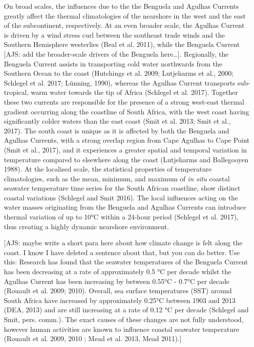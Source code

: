 \documentclass[12pt,A4paper,]{article}
\begin{document}
On broad scales, the influences due to the the Benguela and Agulhas
Currents greatly affect the thermal climatologies of the nearshore in
the west and the east of the subcontinent, respectively. At an even
broader scale, the Agulhas Current is driven by a wind stress curl
between the southeast trade winds and the Southern Hemisphere westerlies
(Beal et al. 2011), while the Benguela Current {[}AJS: add the
broader-scale drivers of the Benguela here\ldots{}{]}. Regionally, the
Benguela Current assists in transporting cold water northwards from the
Southern Ocean to the coast (Hutchings et al. 2009; Lutjeharms et al.,
2000; Schlegel et al. 2017; Lünning, 1990), whereas the Agulhas Current
transports sub-tropical, warm water towards the tip of Africa (Schlegel
et al. 2017). Together these two currents are responsible for the
presence of a strong west-east thermal gradient occurring along the
coastline of South Africa, with the west coast having significantly
colder waters than the east coast (Smit et al. 2013; Smit et al., 2017).
The south coast is unique as it is affected by both the Benguela and
Agulhas Currents, with a strong overlap region from Cape Agulhas to Cape
Point (Smit et al., 2017), and it experiences a greater spatial and
temporal variation in temperature compared to elsewhere along the coast
(Lutjeharms and Ballegooyen 1988). At the localised scale, the
statistical properties of temperature climatologies, such as the mean,
minimum, and maximum of \emph{in situ} coastal seawater temperature time
series for the South African coastline, show distinct coastal variations
(Schlegel and Smit 2016). The local influences acting on the water
masses originating from the Benguela and Agulhas Currents can introduce
thermal variation of up to 10°C within a 24-hour period (Schlegel et al.
2017), thus creating a highly dynamic nearshore environment.

{[}AJS: maybe write a short para here about how climate change is felt
along the coast. I know I have deleted a sentence about that, but you
can do better. Use this: Research has found that the seawater
temperatures of the Benguela Current has been decreasing at a rate of
approximately 0.5 °C per decade whilst the Agulhas Current has been
increasing by between 0.55°C - 0.7°C per decade (Rouault et al. 2009;
2010). Overall, sea surface temperatures (SST) around South Africa have
increased by approximately 0.25°C between 1903 and 2013 (DEA, 2013) and
are still increasing at a rate of 0.12 °C per decade (Schlegel and Smit,
pers. comm.). The exact causes of these changes are not fully
understood, however human activities are known to influence coastal
seawater temperature (Rouault et al. 2009, 2010 ; Mead et al. 2013, Mead
2011).{]}
\end{document}
